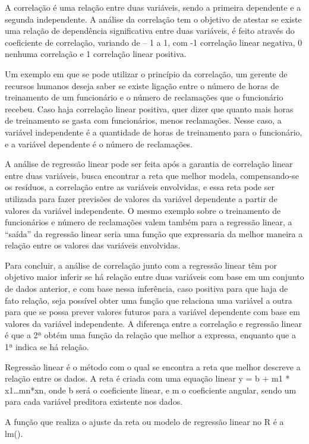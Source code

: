 \documentclass[
]{article}
\begin{document}
A correlação é uma relação entre duas variáveis, sendo a primeira
dependente e a segunda independente. A análise da correlação tem o
objetivo de atestar se existe uma relação de dependência significativa
entre duas variáveis, é feito através do coeficiente de correlação,
variando de -- 1 a 1, com -1 correlação linear negativa, 0 nenhuma
correlação e 1 correlação linear positiva.

Um exemplo em que se pode utilizar o princípio da correlação, um gerente
de recursos humanos deseja saber se existe ligação entre o número de
horas de treinamento de um funcionário e o número de reclamações que o
funcionário recebeu. Caso haja correlação linear positiva, quer dizer
que quanto mais horas de treinamento se gasta com funcionários, menos
reclamações. Nesse caso, a variável independente é a quantidade de horas
de treinamento para o funcionário, e a variável dependente é o número de
reclamações.

A análise de regressão linear pode ser feita após a garantia de
correlação linear entre duas variáveis, busca encontrar a reta que
melhor modela, compensando-se os resíduos, a correlação entre as
variáveis envolvidas, e essa reta pode ser utilizada para fazer
previsões de valores da variável dependente a partir de valores da
variável independente. O mesmo exemplo sobre o treinamento de
funcionários e número de reclamações valem também para a regressão
linear, a ``saída'' da regressão linear seria uma função que expressaria
da melhor maneira a relação entre os valores das variáveis envolvidas.

Para concluir, a análise de correlação junto com a regressão linear têm
por objetivo maior inferir se há relação entre duas variáveis com base
em um conjunto de dados anterior, e com base nessa inferência, caso
positiva para que haja de fato relação, seja possível obter uma função
que relaciona uma variável a outra para que se possa prever valores
futuros para a variável dependente com base em valores da variável
independente. A diferença entre a correlação e regressão linear é que a
2ª obtém uma função da relação que melhor a expressa, enquanto que a 1ª
indica se há relação.

Regressão linear é o método com o qual se encontra a reta que melhor
descreve a relação entre os dados. A reta é criada com uma equação
linear y = b + m1 * x1\ldots mn*xn, onde b será o coeficiente linear, e
m o coeficiente angular, sendo um para cada variável preditora existente
nos dados.

A função que realiza o ajuste da reta ou modelo de regressão linear no R
é a lm().
\end{document}
